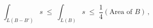 \begin{equation}
\int_{L(B-B')}s \; \leq \; \int_{L(B)} s \; \leq \; \frac{1}{4}
(\text{Area of } B)\,
,
\end{equation}

